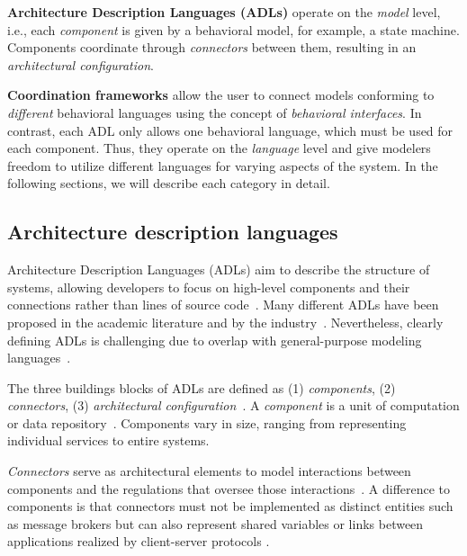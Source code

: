 \documentclass[runningheads]{llncs}
\begin{document}
\textbf{Architecture Description Languages (ADLs)} operate on the \textit{model} level, i.e., each \textit{component} is given by a behavioral model, for example, a state machine.
Components coordinate through \textit{connectors} between them, resulting in an \textit{architectural configuration}.

\textbf{Coordination frameworks} allow the user to connect models conforming to \textit{different} behavioral languages using the concept of \textit{behavioral interfaces}.
In contrast, each ADL only allows one behavioral language, which must be used for each component.
Thus, they operate on the \textit{language} level and give modelers freedom to utilize different languages for varying aspects of the system.
In the following sections, we will describe each category in detail.

\subsection{Architecture description languages} \label{subsec:adl}
Architecture Description Languages (ADLs) aim to describe the structure of systems, allowing developers to focus on high-level components and their connections rather than lines of source code~\cite{clementsSurveyArchitectureDescription1996,medvidovicClassificationComparisonFramework2000,medvidovicFrameworkClassifyingComparing1997}.
Many different ADLs have been proposed in the academic literature and by the industry~\cite{medvidovicClassificationComparisonFramework2000,woodsArchitectureDescriptionLanguages2005}.
Nevertheless, clearly defining ADLs is challenging due to overlap with general-purpose modeling languages~\cite{clementsSurveyArchitectureDescription1996}.

The three buildings blocks of ADLs are defined as (1) \textit{components}, (2) \textit{connectors}, (3) \textit{architectural configuration}~\cite{medvidovicClassificationComparisonFramework2000,medvidovicFrameworkClassifyingComparing1997}.
A \textit{component} is a unit of computation or data repository~\cite{medvidovicClassificationComparisonFramework2000}.
Components vary in size, ranging from representing individual services to entire systems.

\textit{Connectors} serve as architectural elements to model interactions between components and the regulations that oversee those interactions~\cite{medvidovicClassificationComparisonFramework2000}.
A difference to components is that connectors must not be implemented as distinct entities such as message brokers but can also represent shared variables or links between applications realized by client-server protocols \cite{medvidovicClassificationComparisonFramework2000}.
\end{document}
